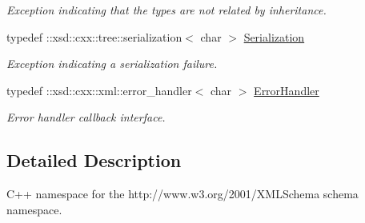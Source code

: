\begin{DoxyCompactItemize}
\begin{DoxyCompactList}\small\item\em Exception indicating that the types are not related by inheritance. \item\end{DoxyCompactList}\item 
\hypertarget{namespacexml__schema_a54d32500aa6240de815682c42a236b26}{
typedef ::xsd::cxx::tree::serialization$<$ char $>$ \hyperlink{namespacexml__schema_a54d32500aa6240de815682c42a236b26}{Serialization}}
\label{namespacexml__schema_a54d32500aa6240de815682c42a236b26}

\begin{DoxyCompactList}\small\item\em Exception indicating a serialization failure. \item\end{DoxyCompactList}\item 
\hypertarget{namespacexml__schema_ab1c9361bfd3b404eaabf0c31eded79dc}{
typedef ::xsd::cxx::xml::error\_\-handler$<$ char $>$ \hyperlink{namespacexml__schema_ab1c9361bfd3b404eaabf0c31eded79dc}{ErrorHandler}}
\label{namespacexml__schema_ab1c9361bfd3b404eaabf0c31eded79dc}

\begin{DoxyCompactList}\small\item\em Error handler callback interface. \item\end{DoxyCompactList}\end{DoxyCompactItemize}


\subsection{Detailed Description}
C++ namespace for the http://www.w3.org/2001/XMLSchema schema namespace. 